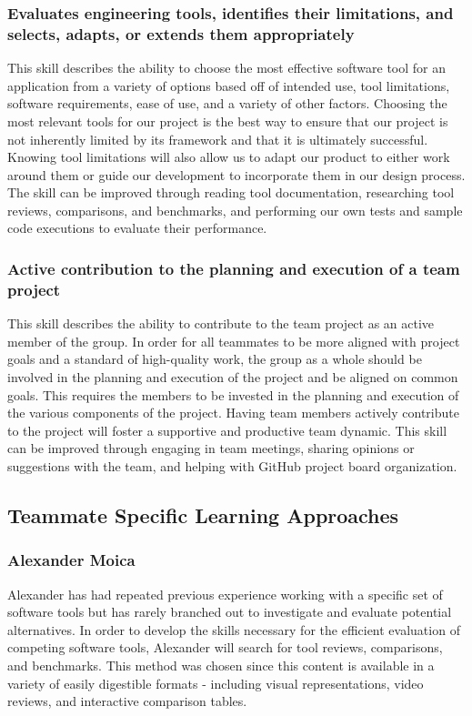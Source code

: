 \documentclass[12pt]{article}
\begin{document}
{\subsubsection{Evaluates engineering tools, identifies their limitations, and selects, adapts, or extends them appropriately}
This skill describes the ability to choose the most effective software tool for an application from a variety of options based off of intended use, tool limitations, software requirements, ease of use, and a variety of other factors. Choosing the most relevant tools for our project is the best way to ensure that our project is not inherently limited by its framework and that it is ultimately successful. Knowing tool limitations will also allow us to adapt our product to either work around them or guide our development to incorporate them in our design process. The skill can be improved through reading tool documentation, researching tool reviews, comparisons, and benchmarks, and performing our own tests and sample code executions to evaluate their performance. 

\subsubsection{Active contribution to the planning and execution of a team project}
This skill describes the ability to contribute to the team project as an active member of the group. In order for all teammates to be more aligned with project goals and a standard of high-quality work, the group as a whole should be involved in the planning and execution of the project and be aligned on common goals. This requires the members to be invested in the planning and execution of the various components of the project. Having team members actively contribute to the project will foster a supportive and productive team dynamic. This skill can be improved through engaging in team meetings, sharing opinions or suggestions with the team, and helping with GitHub project board organization.

\subsection{Teammate Specific Learning Approaches}
\subsubsection{Alexander Moica}
Alexander has had repeated previous experience working with a specific set of software tools but has rarely branched out to investigate and evaluate potential alternatives. In order to develop the skills necessary for the efficient evaluation of competing software tools, Alexander will search for tool reviews, comparisons, and benchmarks. This method was chosen since this content is available in a variety of easily digestible formats - including visual representations, video reviews, and interactive comparison tables.

}
\end{document}
